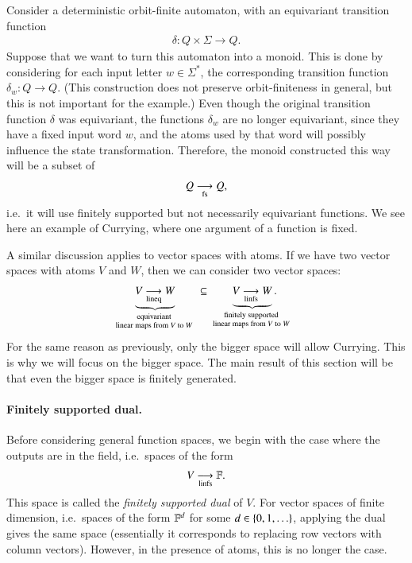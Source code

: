 \begin{myexample}
    Consider a deterministic orbit-finite automaton, with an equivariant transition function 
    \begin{align*}
    \delta : Q \times \Sigma \to Q.
    \end{align*}
    Suppose that we want to turn this automaton into a monoid. This is done by considering for each input letter $w \in \Sigma^*$, the corresponding transition function $\delta_w : Q \to Q$. (This construction does not preserve orbit-finiteness in general, but this is not important for the example.) Even though the original transition  function $\delta$ was equivariant, the functions $\delta_w$ are no longer equivariant, since they have a fixed input word $w$, and the atoms used by that word will possibly influence the state transformation. Therefore, the monoid constructed this way will be a subset of 
    \begin{align*}
    Q \underset{\text{fs}}{\longrightarrow} Q,
    \end{align*}
    i.e.~it will use finitely supported but not necessarily equivariant functions.
    We see here an example of Currying, where one argument of a function is fixed.
\end{myexample}



A similar discussion applies to vector spaces with atoms. If we have two vector spaces with atoms $V$ and $W$, then we can consider two vector spaces:
\begin{align*}
\myunderbrace{\lineqfun V W}{equivariant\\ linear maps from $V$ to $W$}
\qquad \subseteq \qquad
\myunderbrace{\linfsfun V W}{finitely supported\\ linear maps from $V$ to $W$}.
\end{align*}
For the same reason as previously, only the bigger space will allow Currying. This is why we will focus on the bigger space. The main result of this section will be that even  the bigger space is finitely generated.


\paragraph*{Finitely supported dual.} Before considering general function spaces, we begin with the case where the outputs are in the field, i.e.~spaces of the form 
\begin{align*}
V \underset{\text{linfs}}{\longrightarrow} \mathbb F.
\end{align*}
This space is called the \emph{finitely supported dual} of $V$. For vector spaces of finite dimension, i.e.~spaces of the form $\mathbb F^d$ for some $d \in \{0,1,\ldots\}$,  applying the dual gives the same space (essentially it corresponds to replacing row vectors with column vectors). However, in the presence of  atoms, this is no longer the case.

